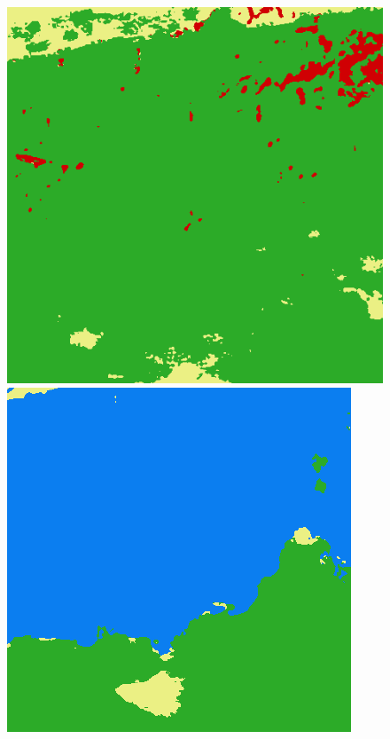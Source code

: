 \begin{figure}
    \includegraphics[width=\UnetPredictionsImageWidth]{images/unet/unet-18D/82607-prediction} \hfill
    \includegraphics[width=\UnetPredictionsImageWidth]{images/unet/unet-23/82607-prediction} \hfill

\end{figure}
